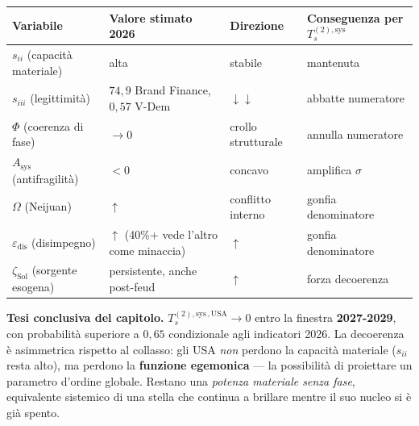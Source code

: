 {\def\LTcaptype{none} %
{\small\begin{longtable}[]{@{}
  >{\raggedright\arraybackslash}p{}
  >{\raggedright\arraybackslash}p{}
  >{\raggedright\arraybackslash}p{}
  >{\raggedright\arraybackslash}p{}@{}}
\toprule\noalign{}
\begin{minipage}[b]{\linewidth}\raggedright
Variabile
\end{minipage} & \begin{minipage}[b]{\linewidth}\raggedright
Valore stimato 2026
\end{minipage} & \begin{minipage}[b]{\linewidth}\raggedright
Direzione
\end{minipage} & \begin{minipage}[b]{\linewidth}\raggedright
Conseguenza per \(T_s^{(2),\text{sys}}\)
\end{minipage} \\
\midrule\noalign{}
\endhead
\bottomrule\noalign{}
\endlastfoot
\(s_{ii}\) (capacità materiale) & alta & stabile & mantenuta \\
\(s_{iii}\) (legittimità) & \(74{,}9\) Brand Finance, \(0{,}57\) V-Dem &
\(\downarrow\downarrow\) & abbatte numeratore \\
\(\Phi\) (coerenza di fase) & \(\to 0\) & crollo strutturale & annulla
numeratore \\
\(A_{\text{sys}}\) (antifragilità) & \(< 0\) & concavo & amplifica
\(\sigma\) \\
\(\Omega\) (Neijuan) & \(\uparrow\) & conflitto interno & gonfia
denominatore \\
\(\varepsilon_{\text{dis}}\) (disimpegno) & \(\uparrow\) (40\%+ vede
l'altro come minaccia) & \(\uparrow\) & gonfia denominatore \\
\(\zeta_{\text{Sol}}\) (sorgente esogena) & persistente, anche post-feud
& \(\uparrow\) & forza decoerenza \\
\end{longtable}}
}

\Hypoth{} \textbf{Tesi conclusiva del capitolo.}
\(T_s^{(2),\text{sys}\,,\text{USA}} \to 0\) entro la finestra
\textbf{2027-2029}, con probabilità superiore a \(0{,}65\) condizionale
agli indicatori 2026. La decoerenza è asimmetrica rispetto al collasso:
gli USA \emph{non} perdono la capacità materiale (\(s_{ii}\) resta
alto), ma perdono la \textbf{funzione egemonica} --- la possibilità di
proiettare un parametro d'ordine globale. Restano una \emph{potenza
materiale senza fase}, equivalente sistemico di una stella che continua
a brillare mentre il suo nucleo si è già spento.



